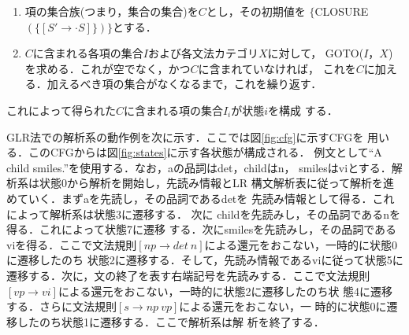 \begin{enumerate}
\item 項の集合族(つまり，集合の集合)を$C$とし，その初期値を
  $\{$CLOSURE$(\{[S' \to \cdot S]\})\}$とする．
\item $C$に含まれる各項の集合$I$および各文法カテゴリ$X$に対して，
  GOTO($I$，$X$)を求める．これが空でなく，かつ$C$に含まれていなければ，
  これを$C$に加える．加えるべき項の集合がなくなるまで，これを繰り返す．
\end{enumerate}

これによって得られた$C$に含まれる項の集合$I_{i}$が状態$i$を構成
する．

GLR法での解析系の動作例を次に示す．ここでは図\ref{fig:cfg}に示すCFGを
用いる．このCFGからは図\ref{fig:states}に示す各状態が構成される．
例文として``A child smiles.''を使用する．なお，aの品詞はdet，childはn，
smilesはviとする．解析系は状態0から解析を開始し，先読み情報とLR 
構文解析表に従って解析を進めていく．まずaを先読し，その品詞であるdetを
先読み情報として得る．これによって解析系は状態3に遷移する． 次に
childを先読みし，その品詞であるnを得る．これによって状態7に遷移
する．次にsmilesを先読みし，その品詞であるviを得る．ここで文法規則$[np
\to det\ n]$による還元をおこない，一時的に状態0に遷移したのち
状態2に遷移する．そして，先読み情報であるviに従って状態5に
遷移する．次に，文の終了を表す右端記号を先読みする．ここで文法規則$[vp
\to vi]$による還元をおこない，一時的に状態2に遷移したのち状
態4に遷移する．さらに文法規則$[s \to np\ vp]$による還元をおこない，一
時的に状態0に遷移したのち状態1に遷移する．ここで解析系は解
析を終了する．

\newlength{\mpw}
\setlength{\mpw}{3cm}

